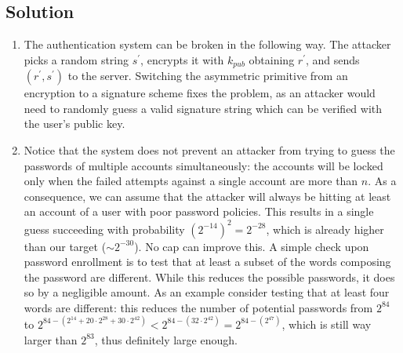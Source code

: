 \subsection*{Solution}
\begin{enumerate}
    \item  The authentication system can be broken in the following way. 
        The attacker picks a random string $s^\prime$, encrypts it with $k_{pub}$ obtaining $r^\prime$, and sends $(r^\prime,s^\prime)$ to the server. 
        Switching the asymmetric primitive from an encryption to a signature scheme fixes the problem, as an attacker would need to randomly guess a valid signature string which can be verified with the user's public key.
    \item Notice that the system does not prevent an attacker from trying to guess the passwords of multiple accounts simultaneously: the accounts will be locked only when the failed attempts against a single account are more than $n$.
        As a consequence, we can assume that the attacker will always be hitting at least an account of a user with poor password policies. 
        This results in a single guess succeeding with probability $(2^{-14})^2 = 2^{-28}$, which is already higher than our target ($\sim 2^{-30}$). 
        No cap can improve this. 
        A simple check upon password enrollment is to test that at least a subset of the words composing the password are different. 
        While this reduces the possible passwords, it does so by a negligible amount.
        As an example consider testing that at least four words are different: this reduces the number of potential passwords from $2^{84}$ to $2^{84-(2^{14}+20\cdot 2^{28}+30\cdot 2^{42})} < 2^{84-(32\cdot 2^{42})} = 2^{84-(2^{47})}$, which is still way larger than $2^{83}$, thus definitely large enough.
\end{enumerate}